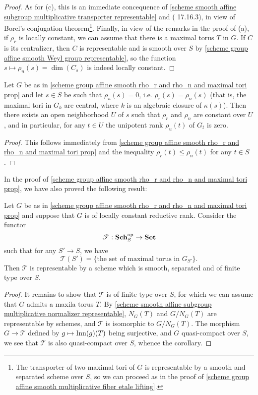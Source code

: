 \begin{proof}
As for (c), this is an immediate concequence of \cref{scheme smooth affine subgroup multiplicative transporter representable} and (\cite{EGA4-4} 17.16.3), in view of Borel's conjugation theorem\footnote{The transporter of two maximal tori of $G$ is representable by a smooth and separated scheme over $S$, so we can proceed as in the proof of \cref{scheme group affine smooth multiplicative fiber etale lifting}.}. Finally, in view of the remarks in the proof of (a), if $\rho_r$ is locally constant, we can assume that there is a maximal torus $T$ in $G$. If $C$ is its centralizer, then $C$ is representable and is smooth over $S$ by \cref{scheme group affine smooth Weyl group representable}, so the function $s\mapsto\rho_n(s)=\dim(C_s)$ is indeed locally constant.
\end{proof}

\begin{corollary}\label{scheme group affine smooth rho_u zero prop}
Let $G$ be as in \cref{scheme group affine smooth rho_r and rho_n and maximal tori prop} and let $s\in S$ be such that $\rho_u(s)=0$, i.e. $\rho_r(s)=\rho_n(s)$ (that is, the maximal tori in $G_k$ are central, where $k$ is an algebraic closure of $\kappa(s)$). Then there exists an open neighborhood $U$ of $s$ such that $\rho_r$ and $\rho_n$ are constant over $U$, and in particular, for any $t\in U$ the unipotent rank $\rho_u(t)$ of $G_t$ is zero.
\end{corollary}
\begin{proof}
This follows immediately from \cref{scheme group affine smooth rho_r and rho_n and maximal tori prop} and the inequality $\rho_r(t)\leq\rho_n(t)$ for any $t\in S$.
\end{proof}

In the proof of \cref{scheme group affine smooth rho_r and rho_n and maximal tori prop}, we have also proved the following result:

\begin{corollary}\label{scheme group affine smooth maximal tori functor prop}
Let $G$ be as in \cref{scheme group affine smooth rho_r and rho_n and maximal tori prop} and suppose that $G$ is of locally constant reductive rank. Consider the functor
\[\mathscr{T}:\mathbf{Sch}_S^{\mathrm{op}}\to\mathbf{Set}\]
such that for any $S'\to S$, we have
\[\mathscr{T}(S')=\{\text{the set of maximal torus in $G_{S'}$}\}.\]
Then $\mathscr{T}$ is representable by a scheme which is smooth, separated and of finite type over $S$.
\end{corollary}
\begin{proof}
It remains to show that $\mathscr{T}$ is of finite type over $S$, for which we can assume that $G$ admits a maxila torus $T$. By \cref{scheme smooth affine subgroup multiplicative normalizer representable}, $N_G(T)$ and $G/N_G(T)$ are representable by schemes, and $\mathscr{T}$ is isomorphic to $G/N_G(T)$. The morphism $G\to\mathscr{T}$ defined by $g\mapsto\mathrm{Inn}(g)(T)$ being surjective, and $G$ quasi-compact over $S$, we see that $\mathscr{T}$ is also quasi-compact over $S$, whence the corollary. 
\end{proof}

